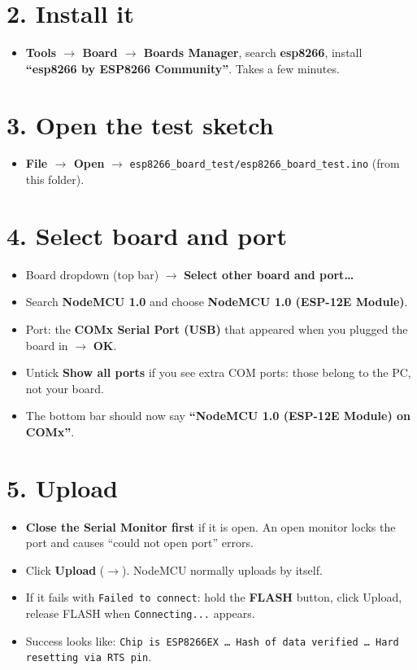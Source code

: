 \documentclass[11pt]{article}
\newcommand{\menu}[1]{\textbf{#1}}
\begin{document}
\section*{2. Install it}
\begin{itemize}
\item \menu{Tools $\rightarrow$ Board $\rightarrow$ Boards Manager}, search \textbf{esp8266}, install \textbf{``esp8266 by ESP8266 Community''}. Takes a few minutes.
\end{itemize}

\section*{3. Open the test sketch}
\begin{itemize}
\item \menu{File $\rightarrow$ Open} $\rightarrow$ \texttt{esp8266\_board\_test/esp8266\_board\_test.ino} (from this folder).
\end{itemize}

\section*{4. Select board and port}
\begin{itemize}
\item Board dropdown (top bar) $\rightarrow$ \menu{Select other board and port\dots}
\item Search \textbf{NodeMCU 1.0} and choose \textbf{NodeMCU 1.0 (ESP-12E Module)}.
\item Port: the \textbf{COMx Serial Port (USB)} that appeared when you plugged the board in $\rightarrow$ \menu{OK}.
\item Untick \menu{Show all ports} if you see extra COM ports: those belong to the PC, not your board.
\item The bottom bar should now say \textbf{``NodeMCU 1.0 (ESP-12E Module) on COMx''}.
\end{itemize}

\section*{5. Upload}
\begin{itemize}
\item \textbf{Close the Serial Monitor first} if it is open. An open monitor locks the port and causes ``could not open port'' errors.
\item Click \menu{Upload} ($\rightarrow$). NodeMCU normally uploads by itself.
\item If it fails with \texttt{Failed to connect}: hold the \textbf{FLASH} button, click Upload, release FLASH when \texttt{Connecting...} appears.
\item Success looks like: \texttt{Chip is ESP8266EX \dots\ Hash of data verified \dots\ Hard resetting via RTS pin}.
\end{itemize}
\end{document}
